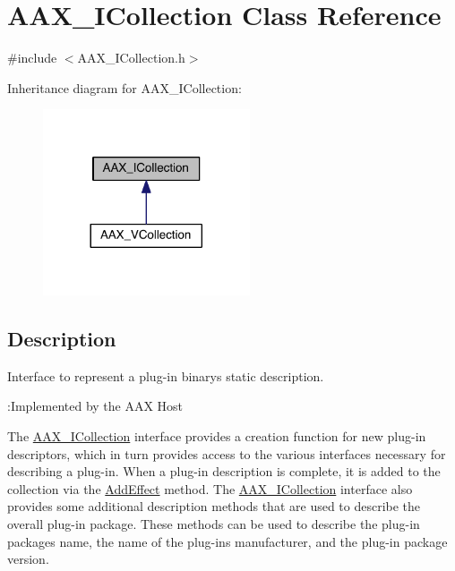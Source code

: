 \hypertarget{a00087}{}\section{A\+A\+X\+\_\+\+I\+Collection Class Reference}
\label{a00087}


{\ttfamily \#include $<$A\+A\+X\+\_\+\+I\+Collection.\+h$>$}



Inheritance diagram for A\+A\+X\+\_\+\+I\+Collection\+:
\nopagebreak
\begin{figure}[H]
\begin{center}
\leavevmode
\includegraphics[width=173pt]{a00603}
\end{center}
\end{figure}


\subsection{Description}
Interface to represent a plug-\/in binary\textquotesingle{}s static description. 

\begin{DoxyRefDesc}{\+:\+Implemented by the A\+A\+X Host}
\item[\hyperlink{a00001__aax_host_implementation000002}{\+:\+Implemented by the A\+A\+X Host}]\end{DoxyRefDesc}


The \hyperlink{a00087}{A\+A\+X\+\_\+\+I\+Collection} interface provides a creation function for new plug-\/in descriptors, which in turn provides access to the various interfaces necessary for describing a plug-\/in. When a plug-\/in description is complete, it is added to the collection via the \hyperlink{a00087_a5ff114b8c4da2081515186f2faf65c8c}{Add\+Effect} method. The \hyperlink{a00087}{A\+A\+X\+\_\+\+I\+Collection} interface also provides some additional description methods that are used to describe the overall plug-\/in package. These methods can be used to describe the plug-\/in package\textquotesingle{}s name, the name of the plug-\/in\textquotesingle{}s manufacturer, and the plug-\/in package version.

